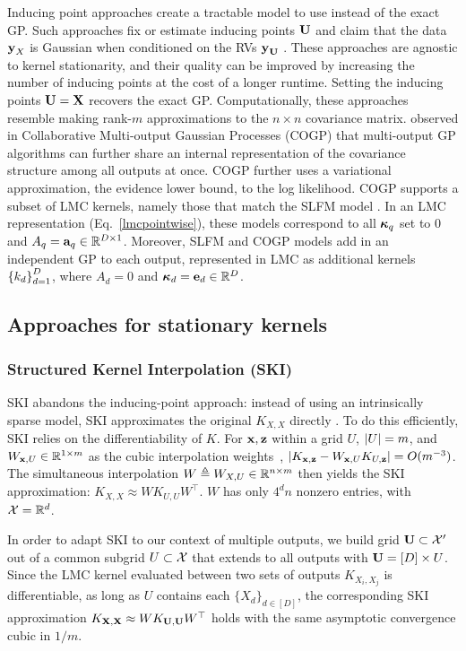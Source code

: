 \documentclass{article}
\begin{document}
Inducing point approaches create a tractable model to use instead of the exact GP. Such approaches fix or estimate inducing points $\textbf{U}$ and claim that the data $\textbf{y}_X$ is Gaussian when conditioned on the RVs $\textbf{y}_{\textbf{U}}$  \cite{quinonero2005unifying}. These approaches are agnostic to kernel stationarity, and their quality can be improved by increasing the number of inducing points at the cost of a longer runtime. Setting the inducing points $\textbf{U}=\textbf{X}$ recovers the exact GP. Computationally, these approaches resemble making rank-$m$ approximations to the $n\times n$ covariance matrix.
\citet{nguyen2014collaborative} observed in Collaborative Multi-output Gaussian Processes (COGP) that multi-output GP algorithms can further share an internal representation of the covariance structure among all outputs at once. COGP further uses a variational approximation, the evidence lower bound, to the log likelihood. COGP supports a subset of LMC kernels, namely those that match the SLFM model \cite{seeger2005semiparametric}. In an LMC representation (Eq.~\ref{lmcpointwise}), these models correspond to all ${\boldsymbol\kappa}_q$ set to 0 and $A_q=\textbf{a}_q\in\mathbb{R}^{D\times 1}$. Moreover, SLFM and COGP models add in an independent GP to each output, represented in LMC as additional kernels $\left\{ k_d \right\}_{ d=1 }^{ D }$, where $A_d=0$ and ${\boldsymbol\kappa}_d=\textbf{e}_d\in\mathbb{R}^D$.

\subsection{Approaches for stationary kernels}

\subsubsection{Structured Kernel Interpolation (SKI)}\label{ski-section}

SKI abandons the inducing-point approach: instead of using an intrinsically sparse model, SKI approximates the original $K_{X,X}$ directly \cite{kiss-gp}. To do this efficiently, SKI relies on the differentiability of $K$. For $\textbf{x},\textbf{z}$ within a grid $U$, $\left\vert{U}\right\vert=m$, and $W_{\textbf{x},U}\in\mathbb{R}^{1\times m}$ as the cubic interpolation weights~\cite{keys1981cubic}, $\left|K_{\textbf{x},\textbf{z}}-W_{\textbf{x},U}K_{U,\textbf{z}}\right|=O(m^{-3})$. The simultaneous interpolation $W\triangleq W_{X,U}\in\mathbb{R}^{n\times m}$ then yields the SKI approximation: $K_{X,X}\approx WK_{U,U}W^\top$. $W$ has only $4^dn$ nonzero entries, with $\mathcal{X}=\mathbb{R}^d$.

In order to adapt SKI to our context of multiple outputs, we build grid $\textbf{U}\subset\mathcal{X}'$ out of a common subgrid $U\subset\mathcal{X}$ that extends to all outputs with $\textbf{U} = [D]\times U$. Since the LMC kernel evaluated between two sets of outputs $K_{X_i,X_j}$ is differentiable, as long as $U$ contains each $\{X_d\}_{d\in[D]}$, the corresponding SKI approximation $K_{\textbf{X},\textbf{X}}\approx WK_{\textbf{U},\textbf{U}}W^\top$ holds with the same asymptotic convergence cubic in $1/m$.
\end{document}
